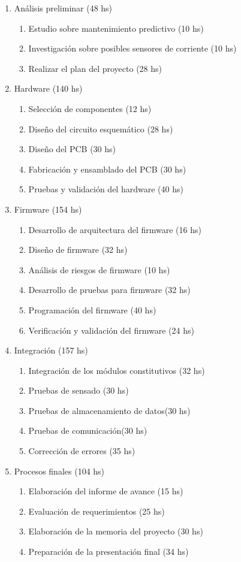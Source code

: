 \documentclass[11pt]{charter}
\begin{document}
\begin{enumerate}
\item Análisis preliminar (48 hs)
	\begin{enumerate}
	\item Estudio sobre mantenimiento predictivo (10 hs)
	\item Investigación sobre posibles sensores de corriente (10 hs)
	\item Realizar el plan del proyecto (28 hs)
	\end{enumerate}
\item Hardware (140 hs)
	\begin{enumerate}
	\item Selección de componentes (12 hs)
	\item Diseño del circuito esquemático (28 hs)
	\item Diseño del PCB (30 hs)
	\item Fabricación y ensamblado del PCB (30 hs)
	\item Pruebas y validación del hardware (40 hs)
	\end{enumerate}
\item Firmware (154 hs)
	\begin{enumerate}
	\item Desarrollo de arquitectura del firmware  (16 hs)
	\item Diseño de firmware (32 hs)
	\item Análisis de riesgos de firmware (10 hs)
	\item Desarrollo de pruebas para firmware (32 hs)
	\item Programación del firmware (40 hs)
	\item Verificación y validación del firmware (24 hs)
	\end{enumerate}
\item Integración (157 hs)
	\begin{enumerate}
	\item Integración de los módulos constitutivos (32 hs)
	\item Pruebas de sensado (30 hs)
	\item Pruebas de almacenamiento de datos(30 hs)
	\item Pruebas de comunicación(30 hs)	
	\item Corrección de errores (35 hs)
	\end{enumerate}
\item Procesos finales (104 hs)
	\begin{enumerate}
	\item Elaboración del informe de avance (15 hs)
	\item Evaluación de requerimientos (25 hs)
	\item Elaboración de la memoria del proyecto (30 hs)
	\item Preparación de la presentación final (34 hs)
	\end{enumerate}
\end{enumerate}
\end{document}
